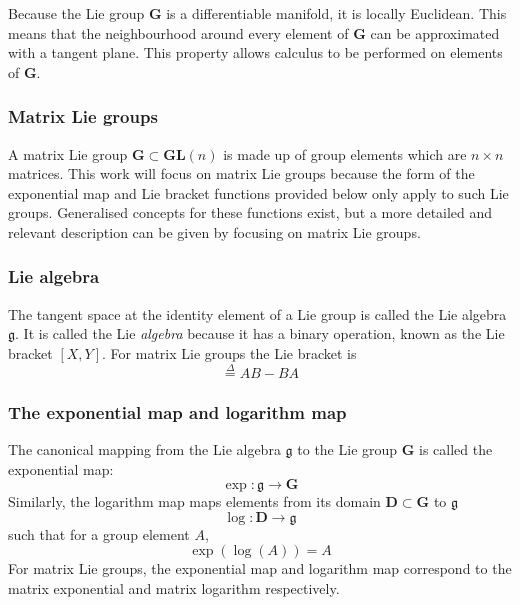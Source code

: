 		Because the Lie group $\mathbf{G}$ is a differentiable manifold, it is locally Euclidean. This means that the neighbourhood around every element of $\mathbf{G}$ can be approximated with a tangent plane. This property allows calculus to be performed on elements of $\mathbf{G}$.
		
		\subsubsection{Matrix Lie groups}
			A matrix Lie group $\mathbf{G} \subset \mathbf{GL}(n)$ is made up of group elements which are $n \times n$ matrices.
			This work will focus on matrix Lie groups because the form of the exponential map and Lie bracket functions provided below only apply to such Lie groups. Generalised concepts for these functions exist, but a more detailed and relevant description can be given by focusing on matrix Lie groups.
		
		\subsubsection{Lie algebra}
			The tangent space at the identity element of a Lie group is called the Lie algebra $\mathfrak{g}$. It is called the Lie \textit{algebra} because it has a binary operation, known as the Lie bracket $[X,Y]$. For matrix Lie groups the Lie bracket is
			\begin{equation}
				[A,B] \stackrel{\Delta}{=} AB-BA
			\end{equation}
			
		\subsubsection{The exponential map and logarithm map}	
			The canonical mapping from the Lie algebra $\mathfrak{g}$ to the Lie group $\mathbf{G}$ is called the exponential map:
			\begin{equation}
				\exp: \mathfrak{g} \rightarrow \mathbf{G}
			\end{equation}			
			Similarly, the logarithm map maps elements from its domain $\mathbf{D} \subset \mathbf{G}$ to $\mathfrak{g}$
			\begin{equation}
				\log: \mathbf{D} \rightarrow \mathfrak{g}
			\end{equation}
			such that for a group element $A$,
			\begin{equation}
				\exp(\log(A)) = A
			\end{equation}
			For matrix Lie groups, the exponential map and logarithm map correspond to the matrix exponential and matrix logarithm respectively.
						
